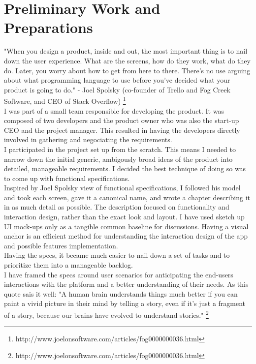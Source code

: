 \section{Preliminary Work and Preparations}

"When you design a product, inside and out, the most important thing is to nail down the user experience. What are the screens, how do they work, what do they do. Later, you worry about how to get from here to there. There's no use arguing about what programming language to use before you've decided what your product is going to do." - Joel Spolsky (co-founder of Trello and Fog Creek Software, and CEO of Stack Overflow) \footnote{http://www.joelonsoftware.com/articles/fog0000000036.html}\\

I was part of a small team responsible for developing the product. It was composed of two developers and the product owner who was also the start-up CEO and the project manager. This resulted in having the developers directly involved in gathering and negociating the requirements.\\

I participated in the project set up from the scratch. This means I needed to narrow down the initial generic, ambigously broad ideas of the product into detailed, manageable requirements. I decided the best technique of doing so was to come up with functional specifications.\\

Inspired by Joel Spolsky view of functional specifications, I followed his model and took each screen, gave it a canonical name, and wrote a chapter describing it in as much detail as possible. The description focused on functionality and interaction design, rather than the exact look and layout. I have used sketch up UI mock-ups only as a tangible common baseline for discussions. Having a visual anchor is an efficient method for understanding the interaction design of the app and possible features implementation.\\

Having the specs, it became much easier to nail down a set of tasks and to prioritize them into a manageable backlog.\\

I have framed the specs around user scenarios for anticipating the end-users interactions with the platform and a better understanding of their needs. As this quote sais it well: "A human brain understands things much better if you can paint a vivid picture in their mind by telling a story, even if it's just a fragment of a story, because our brains have evolved to understand stories." \footnote{http://www.joelonsoftware.com/articles/fog0000000036.html}









